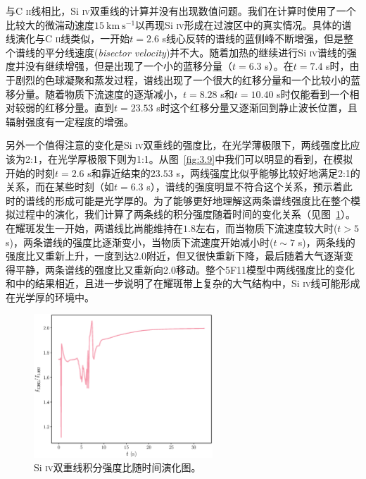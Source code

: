 与C \textsc{ii}线相比，Si \textsc{iv}双重线的计算并没有出现数值问题。我们在计算时使用了一个比较大的微湍动速度$15\ \mathrm{km\  s^{-1}}$以再现Si \textsc{iv}形成在过渡区中的真实情况。具体的谱线演化与C \textsc{ii}线类似，一开始$t=2.6$ s线心反转的谱线的蓝侧峰不断增强，但是整个谱线的平分线速度(\textit{bisector velocity})并不大。随着加热的继续进行Si \textsc{iv}谱线的强度并没有继续增强，但是出现了一个小的蓝移分量（$t=6.3$ s）。在$t=7.4$ s时，由于剧烈的色球凝聚和蒸发过程，谱线出现了一个很大的红移分量和一个比较小的蓝移分量。随着物质下流速度的逐渐减小，$t=8.28$ s和$t=10.40$ s时仅能看到一个相对较弱的红移分量。直到$t=23.53$ s时这个红移分量又逐渐回到静止波长位置，且辐射强度有一定程度的增强。



另外一个值得注意的变化是Si \textsc{iv}双重线的强度比，在光学薄极限下，两线强度比应该为2:1，在光学厚极限下则为1:1。从图~\ref{fig:3.9}中我们可以明显的看到，在模拟开始的时刻$t=2.6$ s和靠近结束的$23.53$ s，两线强度比似乎能够比较好地满足2:1的关系，而在某些时刻（如$t=6.3$ s），谱线的强度明显不符合这个关系，预示着此时的谱线的形成可能是光学厚的。为了能够更好地理解这两条谱线强度比在整个模拟过程中的演化，我们计算了两条线的积分强度随着时间的变化关系（见图~\ref{fig:3.10}）。在耀斑发生一开始，两谱线比尚能维持在$1.8$左右，而当物质下流速度较大时($t>5$ s)，两条谱线的强度比逐渐变小，当物质下流速度开始减小时($t\sim 7$ s)，两条线的强度比又重新上升，一度到达2.0附近，但又很快重新下降，最后随着大气逐渐变得平静，两条谱线的强度比又重新向2.0移动。整个5F11模型中两线强度比的变化和\textcites{Kerr2019}中的结果相近，且进一步说明了在耀斑带上复杂的大气结构中，Si \textsc{iv}线可能形成在光学厚的环境中。

\begin{figure}
	\centering
	\includegraphics[width=0.6\textwidth]{figs/5F11_spectra_line_Si_ratio}
	\caption{Si \textsc{iv}双重线积分强度比随时间演化图。}
	\label{fig:3.10}
\end{figure}

